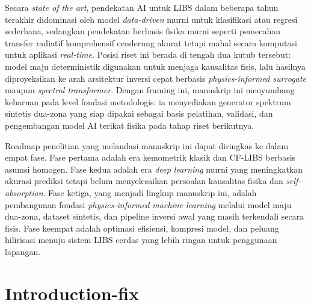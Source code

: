 \documentclass[10pt,leqno]{amsart}
\begin{document}
Secara \textit{state of the art}, pendekatan AI untuk LIBS dalam beberapa tahun terakhir didominasi oleh model \textit{data-driven} murni untuk klasifikasi atau regresi sederhana, sedangkan pendekatan berbasis fisika murni seperti pemecahan transfer radiatif komprehensif cenderung akurat tetapi mahal secara komputasi untuk aplikasi \textit{real-time}. Posisi riset ini berada di tengah dua kutub tersebut: model maju deterministik digunakan untuk menjaga kausalitas fisis, lalu hasilnya diproyeksikan ke arah arsitektur inversi cepat berbasis \textit{physics-informed surrogate} maupun \textit{spectral transformer}. Dengan framing ini, manuskrip ini menyumbang kebaruan pada level fondasi metodologis: ia menyediakan generator spektrum sintetis dua-zona yang siap dipakai sebagai basis pelatihan, validasi, dan pengembangan model AI terikat fisika pada tahap riset berikutnya.

Roadmap penelitian yang melandasi manuskrip ini dapat diringkas ke dalam empat fase. Fase pertama adalah era kemometrik klasik dan CF-LIBS berbasis asumsi homogen. Fase kedua adalah era \textit{deep learning} murni yang meningkatkan akurasi prediksi tetapi belum menyelesaikan persoalan kausalitas fisika dan \textit{self-absorption}. Fase ketiga, yang menjadi lingkup manuskrip ini, adalah pembangunan fondasi \textit{physics-informed machine learning} melalui model maju dua-zona, dataset sintetis, dan pipeline inversi awal yang masih terkendali secara fisis. Fase keempat adalah optimasi efisiensi, kompresi model, dan peluang hilirisasi menuju sistem LIBS cerdas yang lebih ringan untuk penggunaan lapangan.

\section{Introduction-fix}
\end{document}
